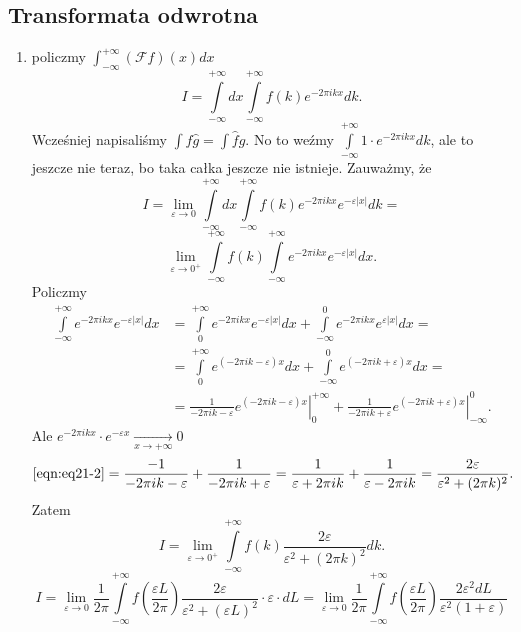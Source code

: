 \documentclass[../main.tex]{subfiles}
\begin{document}
\subsection{Transformata odwrotna}
\begin{enumerate}
    \item policzmy $\int_{-\infty}^{+\infty}\left( \mathcal{F}f \right) (x)dx$
        \[
            I = \int\limits_{-\infty}^{+\infty}dx\int\limits_{-\infty}^{+\infty}f(k)e^{-2\pi i k x}dk
        .\]
    Wcześniej napisaliśmy $\int f \hat{g} = \int \hat{f} g$. No to weźmy $\int\limits_{-\infty}^{+\infty} 1 \cdot e^{-2\pi i kx}dk$, ale to jeszcze nie teraz, bo taka całka jeszcze nie istnieje. Zauważmy, że
        \[
            I = \lim_{\varepsilon \to 0}\int\limits_{-\infty}^{+\infty}dx \int\limits_{-\infty}^{+\infty}f(k)e^{-2\pi i k x}e^{-\varepsilon|x|}dk =
        \]
    \[
        \lim_{\varepsilon \to 0^+} \int\limits_{-\infty}^{+\infty}f(k)\int\limits_{-\infty}^{+\infty}e^{-2\pi i kx}e^{-\varepsilon|x|}dx
    .\]
Policzmy
\begin{align*}
    \int\limits_{-\infty}^{+\infty}e^{-2\pi i kx}e^{-\varepsilon|x|}dx &= \int\limits_{0}^{+\infty}e^{-2\pi i kx}e^{-\varepsilon|x|}dx + \int\limits_{-\infty}^{0}e^{-2\pi i kx}e^{\varepsilon|x|}dx =\\
    &=
    \label{eqn:eq21-2}
    \int\limits_{0}^{+\infty}e^{(-2\pi i k - \varepsilon)x}dx + \int\limits_{-\infty}^{0}e^{(-2\pi ik + \varepsilon)x}dx =\\
    &= \frac{1}{-2\pi i k -\varepsilon}\left.e^{(-2\pi i k - \varepsilon)x}\right|_{0}^{+\infty} + \frac{1}{-2\pi i k + \varepsilon}\left.e^{(-2\pi ik + \varepsilon)x}\right|_{-\infty}^0 \tag{$\star\star$}
.\end{align*}
Ale $e^{-2\pi i kx} \cdot e^{-\varepsilon x}\underset{x\to +\infty}{\longrightarrow} 0$
\[
    \eqref{eqn:eq21-2} = \frac{-1}{-2\pi i k - \varepsilon} + \frac{1}{-2 \pi i k + \varepsilon} = \frac{1}{\varepsilon + 2 \pi i k} + \frac{1}{\varepsilon - 2\pi i k} = \frac{2 \varepsilon}{\varepsilon^2 + (2\pi k)^2}
.\]
Zatem
\[
    I = \lim_{\varepsilon \to 0^+} \int\limits_{-\infty}^{+\infty}f(k) \frac{2\varepsilon}{\varepsilon^2 + (2\pi k)^2}dk
.\]
\[
    I = \lim_{\varepsilon \to 0} \frac{1}{2\pi}\int\limits_{-\infty}^{+\infty}f\left( \frac{\varepsilon L}{2\pi} \right) \frac{2 \varepsilon}{\varepsilon^2 + (\varepsilon L)^2} \cdot \varepsilon \cdot dL = \lim_{\varepsilon \to 0}\frac{1}{2\pi}\int\limits_{-\infty}^{+\infty}f\left( \frac{\varepsilon L}{2\pi} \right) \frac{2 \varepsilon^2 dL}{\varepsilon^2(1+\varepsilon)}
\]
\end{enumerate}
\end{document}
